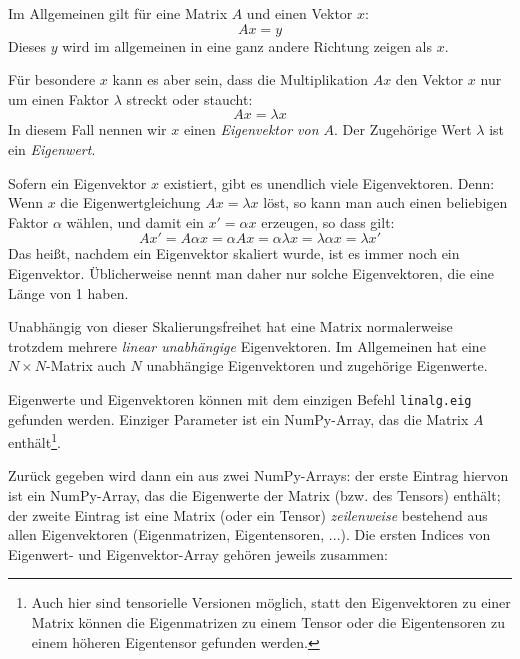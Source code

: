\begin{hintbox}
Im Allgemeinen gilt für eine Matrix $A$ und einen Vektor $x$:
\[ Ax = y \]
Dieses $y$ wird im allgemeinen in eine ganz andere Richtung zeigen als $x$.

Für besondere $x$ kann es aber sein, dass die Multiplikation $Ax$ den Vektor $x$ nur um einen Faktor $\lambda$ streckt oder staucht:
\[ Ax = \lambda x \]
In diesem Fall nennen wir $x$ einen \emph{Eigenvektor von $A$}. Der Zugehörige Wert $\lambda$ ist ein \emph{Eigenwert}.
\end{hintbox}
%
\begin{hintbox}[]
Sofern ein Eigenvektor $x$ existiert, gibt es unendlich viele Eigenvektoren. Denn: Wenn $x$ die Eigenwertgleichung $Ax = \lambda x$ löst, so kann man auch einen beliebigen Faktor $\alpha$ wählen, und damit ein $x' = \alpha x$ erzeugen, so dass gilt: 
\[ Ax' = A\alpha x = \alpha A x = \alpha \lambda x = \lambda \alpha x = \lambda x' \]
Das heißt, nachdem ein Eigenvektor skaliert wurde, ist es immer noch ein Eigenvektor. Üblicherweise nennt man daher nur solche Eigenvektoren, die eine Länge von 1 haben.

Unabhängig von dieser Skalierungsfreihet hat eine Matrix normalerweise trotzdem mehrere \emph{linear unabhängige} Eigenvektoren. Im Allgemeinen hat eine $N \times N$-Matrix auch $N$ unabhängige Eigenvektoren und zugehörige Eigenwerte.
\end{hintbox}

Eigenwerte und Eigenvektoren können mit dem einzigen Befehl \texttt{linalg.eig} gefunden werden. Einziger Parameter ist ein NumPy-Array, das die Matrix $A$ enthält\footnote{Auch hier sind tensorielle Versionen möglich, \ie statt den Eigenvektoren zu einer Matrix können die Eigenmatrizen zu einem Tensor oder die Eigentensoren zu einem höheren Eigentensor gefunden werden.}.

Zurück gegeben wird dann ein  aus zwei NumPy-Arrays: der erste Eintrag hiervon ist ein NumPy-Array, das die Eigenwerte der Matrix (bzw. des Tensors) enthält; der zweite Eintrag ist eine Matrix (oder ein Tensor) \emph{zeilenweise} bestehend aus allen Eigenvektoren (Eigenmatrizen, Eigentensoren, ...). Die ersten Indices von Eigenwert- und Eigenvektor-Array gehören jeweils zusammen:


